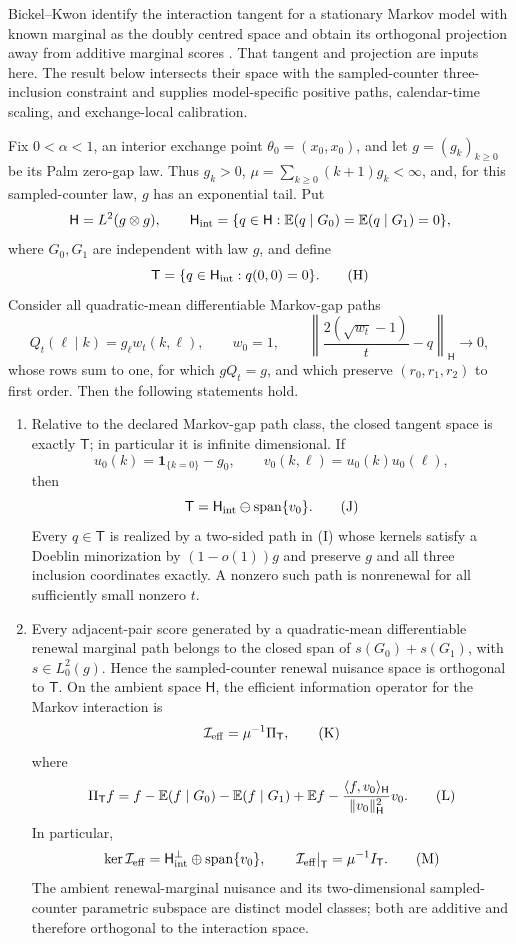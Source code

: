 Bickel--Kwon identify the interaction tangent for a stationary Markov model
with known marginal as the doubly centred space and obtain its orthogonal
projection away from additive marginal scores
\cite{BickelKwon2001Semiparametric}.  That tangent and projection are inputs
here.  The result below intersects their space with the sampled-counter
three-inclusion constraint and supplies model-specific positive paths,
calendar-time scaling, and exchange-local calibration.

\begin{theorem}
\label{thm:complete-markov-palm-tangent-omnibus-main}
Fix $0<\alpha<1$, an interior exchange point $\theta_0=(x_0,x_0)$, and let
$g=(g_k)_{k\geq0}$ be its Palm zero-gap law.  Thus $g_k>0$,
$\mu=\sum_{k\geq0}(k+1)g_k<\infty$, and, for this sampled-counter law,
$g$ has an exponential tail.  Put
\[
 \mathsf H=L^2(g\otimes g),\qquad
 \mathsf H_{\rm int}=\{q\in\mathsf H:
 \mathbb E(q\mid G_0)=\mathbb E(q\mid G_1)=0\},
\]
where $G_0,G_1$ are independent with law $g$, and define
\[
 \mathsf T=\{q\in\mathsf H_{\rm int}:q(0,0)=0\}.
 \tag{H}
\]
Consider all quadratic-mean differentiable Markov-gap paths
\[
 Q_t(\ell\mid k)=g_\ell w_t(k,\ell),\qquad w_0=1,
 \qquad \left\|\frac{2(\sqrt{w_t}-1)}t-q\right\|_{\mathsf H}
 \longrightarrow0,
\tag{I}
\]
whose rows sum to one, for which $gQ_t=g$, and which preserve
$(r_0,r_1,r_2)$ to first order.  Then the following statements hold.

\begin{enumerate}[label=\textup{(\roman*)}]
\item Relative to the declared Markov-gap path class, the closed tangent
space is exactly $\mathsf T$; in
particular it is infinite dimensional.  If
\[
 u_0(k)=\mathbf1_{\{k=0\}}-g_0,\qquad
 v_0(k,\ell)=u_0(k)u_0(\ell),
\]
then
\[
 \mathsf T=\mathsf H_{\rm int}\ominus\operatorname{span}\{v_0\}.
 \tag{J}
\]
Every $q\in\mathsf T$ is realized by a two-sided path in \textup{(I)} whose
kernels satisfy a Doeblin minorization by $(1-o(1))g$ and preserve $g$ and
all three inclusion coordinates exactly.  A nonzero such path is nonrenewal
for all sufficiently small nonzero $t$.

\item Every adjacent-pair score generated by a quadratic-mean differentiable
renewal marginal path belongs to the closed span of
$s(G_0)+s(G_1)$, with $s\in L^2_0(g)$.  Hence the sampled-counter renewal
nuisance space is orthogonal to $\mathsf T$.  On the ambient space
$\mathsf H$, the efficient information operator for the Markov interaction
is
\[
 \mathcal I_{\rm eff}=\mu^{-1}\Pi_{\mathsf T},
 \tag{K}
\]
where
\[
 \Pi_{\mathsf T}f=f-\mathbb E(f\mid G_0)-\mathbb E(f\mid G_1)+\mathbb E f
 -\frac{\langle f,v_0\rangle_{\mathsf H}}
 {\|v_0\|_{\mathsf H}^2}v_0.
 \tag{L}
\]
In particular,
\[
 \ker\mathcal I_{\rm eff}
 =\mathsf H_{\rm int}^{\perp}\oplus\operatorname{span}\{v_0\},
 \qquad
\left.\mathcal I_{\rm eff}\right|_{\mathsf T}
 =\mu^{-1}I_{\mathsf T}.
 \tag{M}
\]
The ambient renewal-marginal nuisance and its two-dimensional
sampled-counter parametric subspace are distinct model classes; both are
additive and therefore orthogonal to the interaction space.


\end{enumerate}
\end{theorem}
